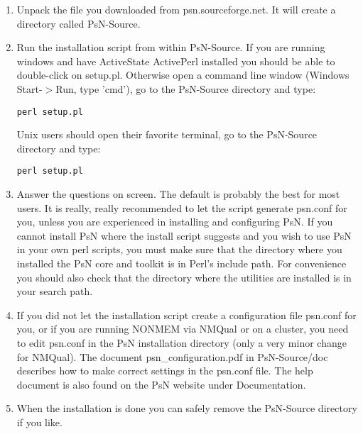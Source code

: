 \begin{enumerate}
\item Unpack the file you downloaded from psn.sourceforge.net. It will create a directory called PsN-Source.
\item Run the installation script from within PsN-Source. If you are running windows and have ActiveState ActivePerl installed you should be able to double-click on setup.pl. Otherwise open a command line window (Windows Start-$>$Run, type 'cmd'), go to the PsN-Source directory and type: 
\begin{verbatim}
perl setup.pl
\end{verbatim}
Unix users should open their favorite terminal, go to the PsN-Source directory and type:
\begin{verbatim}
perl setup.pl
\end{verbatim}
\item Answer the questions on screen. The default is probably the best for most users. It is really, really recommended to let the script generate psn.conf for you, unless you are experienced in installing and configuring PsN.
If you cannot install PsN where the install script suggests and you wish to use PsN in your own perl scripts, you must make sure that the directory where you installed the PsN core and toolkit is in Perl's include path. For convenience you should also check that the directory where the utilities are installed is in your search path. 
\item If you did not let the installation script create a configuration file psn.conf for you, or if you are running NONMEM via NMQual or on a cluster, you need to edit psn.conf in the PsN installation directory (only a very minor change for NMQual). The document psn\_configuration.pdf in PsN-Source/doc describes how to make correct settings in the psn.conf file. The help document is also found on the PsN website under Documentation.
\item When the installation is done you can safely remove the PsN-Source directory if you like. 
\end{enumerate}

